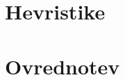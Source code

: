 \documentclass[runningheads]{llncs}
\begin{document}
\section{Hevristike}

\section{Ovrednotev}

 
 
 
\end{document}
